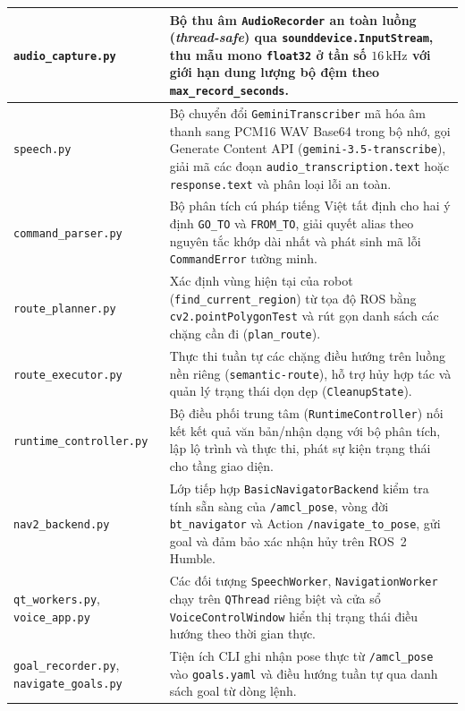 \begin{longtable}{|p{}|p{}|}
\hline
\texttt{audio\_capture.py} & Bộ thu âm \texttt{AudioRecorder} an toàn luồng (\textit{thread-safe}) qua \texttt{sounddevice.InputStream}, thu mẫu mono \texttt{float32} ở tần số $16\,\text{kHz}$ với giới hạn dung lượng bộ đệm theo \texttt{max\_record\_seconds}. \\
\hline
\texttt{speech.py} & Bộ chuyển đổi \texttt{GeminiTranscriber} mã hóa âm thanh sang PCM16 WAV Base64 trong bộ nhớ, gọi Generate Content API (\texttt{gemini-3.5-transcribe}), giải mã các đoạn \texttt{audio\_transcription.text} hoặc \texttt{response.text} và phân loại lỗi an toàn. \\
\hline
\texttt{command\_parser.py} & Bộ phân tích cú pháp tiếng Việt tất định cho hai ý định \texttt{GO\_TO} và \texttt{FROM\_TO}, giải quyết alias theo nguyên tắc khớp dài nhất và phát sinh mã lỗi \texttt{CommandError} tường minh. \\
\hline
\texttt{route\_planner.py} & Xác định vùng hiện tại của robot (\texttt{find\_current\_region}) từ tọa độ ROS bằng \texttt{cv2.pointPolygonTest} và rút gọn danh sách các chặng cần đi (\texttt{plan\_route}). \\
\hline
\texttt{route\_executor.py} & Thực thi tuần tự các chặng điều hướng trên luồng nền riêng (\texttt{semantic-route}), hỗ trợ hủy hợp tác và quản lý trạng thái dọn dẹp (\texttt{CleanupState}). \\
\hline
\texttt{runtime\_controller.py} & Bộ điều phối trung tâm (\texttt{RuntimeController}) nối kết kết quả văn bản/nhận dạng với bộ phân tích, lập lộ trình và thực thi, phát sự kiện trạng thái cho tầng giao diện. \\
\hline
\texttt{nav2\_backend.py} & Lớp tiếp hợp \texttt{BasicNavigatorBackend} kiểm tra tính sẵn sàng của \texttt{/amcl\_pose}, vòng đời \texttt{bt\_navigator} và Action \texttt{/navigate\_to\_pose}, gửi goal và đảm bảo xác nhận hủy trên ROS~2 Humble. \\
\hline
\texttt{qt\_workers.py}, \texttt{voice\_app.py} & Các đối tượng \texttt{SpeechWorker}, \texttt{NavigationWorker} chạy trên \texttt{QThread} riêng biệt và cửa sổ \texttt{VoiceControlWindow} hiển thị trạng thái điều hướng theo thời gian thực. \\
\hline
\texttt{goal\_recorder.py}, \texttt{navigate\_goals.py} & Tiện ích CLI ghi nhận pose thực từ \texttt{/amcl\_pose} vào \texttt{goals.yaml} và điều hướng tuần tự qua danh sách goal từ dòng lệnh. \\
\hline
\end{longtable}

